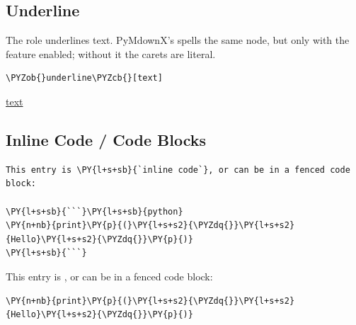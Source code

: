 \documentclass[a4paper,twoside]{article}
\begin{document}
\subsection{Underline}
The  role underlines text. PyMdownX's  spells the same
node, but only with the  feature enabled; without it the carets
are literal.
\begin{tscode}[lang=md, engine=pygments]
\begin{Verbatim}[commandchars=\\\{\},breaklines, breakanywhere, commandchars=\\\{\}]
\PYZob{}underline\PYZcb{}[text]
\end{Verbatim}
\end{tscode}
\begin{displayquote}
\uline{text}
\end{displayquote}
\subsection{Inline Code / Code Blocks}
\begin{tscode}[lang=md, engine=pygments]
\begin{Verbatim}[commandchars=\\\{\},breaklines, breakanywhere, commandchars=\\\{\}]
This entry is \PY{l+s+sb}{`inline code`}, or can be in a fenced code block:

\PY{l+s+sb}{```}\PY{l+s+sb}{python}
\PY{n+nb}{print}\PY{p}{(}\PY{l+s+s2}{\PYZdq{}}\PY{l+s+s2}{Hello}\PY{l+s+s2}{\PYZdq{}}\PY{p}{)}
\PY{l+s+sb}{```}
\end{Verbatim}
\end{tscode}
\begin{displayquote}
This entry is , or can be in a fenced code block:
\begin{tscode}[lang=python, engine=pygments]
\begin{Verbatim}[commandchars=\\\{\},breaklines, breakanywhere, commandchars=\\\{\}]
\PY{n+nb}{print}\PY{p}{(}\PY{l+s+s2}{\PYZdq{}}\PY{l+s+s2}{Hello}\PY{l+s+s2}{\PYZdq{}}\PY{p}{)}
\end{Verbatim}
\end{tscode}
\end{displayquote}
\end{document}

